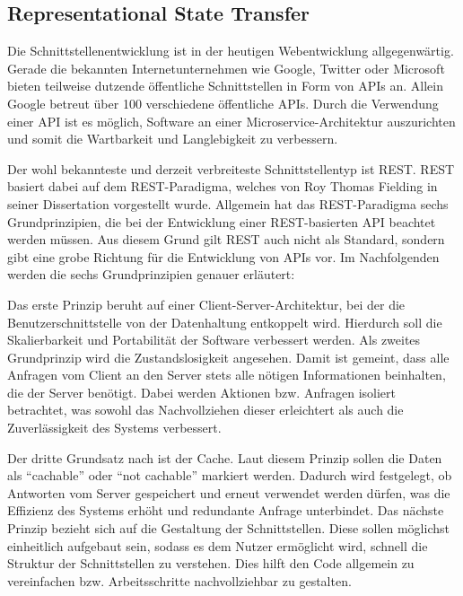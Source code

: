 \subsection{Representational State Transfer}

Die Schnittstellenentwicklung ist in der heutigen Webentwicklung allgegenwärtig.
Gerade die bekannten Internetunternehmen wie Google\autocite{MS-GoogleLLC.2020}, Twitter\autocite{MS-TwitterInc..01.03.2020} oder Microsoft\autocite{MS-MicrosoftCorporation.21.05.2018} bieten teilweise dutzende öffentliche Schnittstellen in Form von \acp{API} an.
Allein Google betreut über 100 verschiedene öffentliche \acp{API}\autocite{rf-google-api-alle}.
Durch die Verwendung einer \ac{API} ist es möglich, Software an einer Microservice-Architektur auszurichten und somit die Wartbarkeit und Langlebigkeit zu verbessern.\autocite{rf-fowler2015microservices}

Der wohl bekannteste und derzeit verbreiteste Schnittstellentyp ist \ac{REST}.
\ac{REST} basiert dabei auf dem \ac{REST}-Paradigma, welches von Roy Thomas Fielding in seiner Dissertation\autocite{MS-Fielding.} vorgestellt wurde. Allgemein hat das \ac{REST}-Paradigma sechs Grundprinzipien, die bei der Entwicklung einer \ac{REST}-basierten \ac{API} beachtet werden müssen. 
Aus diesem Grund gilt \ac{REST} auch nicht als Standard, sondern gibt eine grobe Richtung für die Entwicklung von \acp{API} vor.
Im Nachfolgenden werden die sechs Grundprinzipien genauer erläutert:

Das erste Prinzip beruht auf einer Client-Server-Architektur, bei der die Benutzerschnittstelle von der Datenhaltung entkoppelt wird. %
Hierdurch soll die Skalierbarkeit und Portabilität der Software verbessert werden.
Als zweites Grundprinzip wird die Zustandslosigkeit angesehen.
Damit ist gemeint, dass alle Anfragen vom Client an den Server stets alle nötigen Informationen beinhalten, die der Server benötigt.
Dabei werden Aktionen bzw. Anfragen isoliert betrachtet, was sowohl das Nachvollziehen dieser erleichtert als auch die Zuverlässigkeit des Systems verbessert.

Der dritte Grundsatz nach \citeauthor{MS-Fielding.} ist der Cache. 
Laut diesem Prinzip sollen die Daten als \enquote{cachable} oder \enquote{not cachable} markiert werden.
Dadurch wird festgelegt, ob Antworten vom Server gespeichert und erneut verwendet werden dürfen, was die Effizienz des Systems erhöht und redundante Anfrage unterbindet.
Das nächste Prinzip bezieht sich auf die Gestaltung der Schnittstellen. 
Diese sollen möglichst einheitlich aufgebaut sein, sodass es dem Nutzer ermöglicht wird, schnell die Struktur der Schnittstellen zu verstehen. 
Dies hilft den Code allgemein zu vereinfachen bzw. Arbeitsschritte nachvollziehbar zu gestalten.

